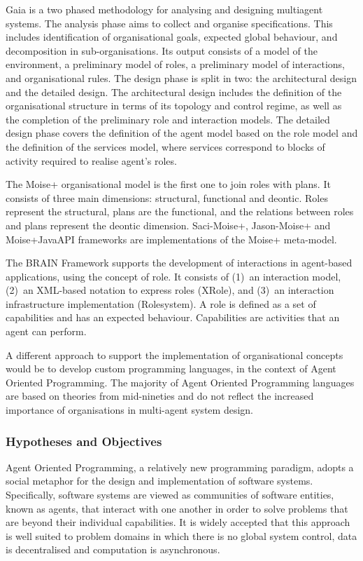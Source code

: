 \documentclass[a4paper,12pt,oneside,fleqn]{book} %
\theoremstyle{plain}
\theoremstyle{definition}
\theoremstyle{remark}
\begin{document}
Gaia \cite{DBLP:journals/aamas/WooldridgeJK00} is a two phased methodology for
analysing and designing multiagent systems. The analysis phase aims to collect
and organise specifications. This includes identification of organisational
goals, expected global behaviour, and decomposition in sub-organisations. Its
output consists of a model of the environment, a preliminary model of roles, a
preliminary model of interactions, and organisational rules. The design phase
is split in two: the architectural design and the detailed design. The
architectural design includes the definition of the organisational structure in
terms of its topology and control regime, as well as the completion of the
preliminary role and interaction models. The detailed design phase covers the
definition of the agent model based on the role model and the definition of the
services model, where services correspond to blocks of activity required to
realise agent's roles.

The Moise+ \cite{DBLP:conf/sbia/HubnerSB02} organisational model is the first one to
join roles with plans. It consists of three main dimensions: structural,
functional and deontic. Roles represent the structural, plans are the
functional, and the relations between roles and plans represent the deontic
dimension. Saci-Moise+, Jason-Moise+ and Moise+JavaAPI frameworks are
implementations of the Moise+ meta-model.

The BRAIN Framework \cite{DBLP:conf/coopis/CabriLZ03} supports the development
of interactions in agent-based applications, using the concept of role. It
consists of (1)~an interaction model, (2)~an XML-based notation to express
roles (XRole), and (3)~an interaction infrastructure implementation
(Rolesystem). A role is defined as a set of capabilities and has an expected
behaviour. Capabilities are activities that an agent can perform.

A different approach to support the implementation of organisational
concepts would be to develop custom programming languages, in the context
of Agent Oriented Programming. The majority of Agent Oriented Programming
languages are based on theories from mid-nineties and do not reflect the
increased importance of organisations in multi-agent system design.

\subsubsection{Hypotheses and Objectives}
Agent Oriented Programming, a relatively new programming paradigm, adopts a
social metaphor for the design and implementation of software systems.
Specifically, software systems are viewed as communities of software entities,
known as agents, that interact with one another in order to solve problems that
are beyond their individual capabilities. It is widely accepted that this
approach is well suited to problem domains in which there is no global system
control, data is decentralised and computation is asynchronous.
\end{document}
